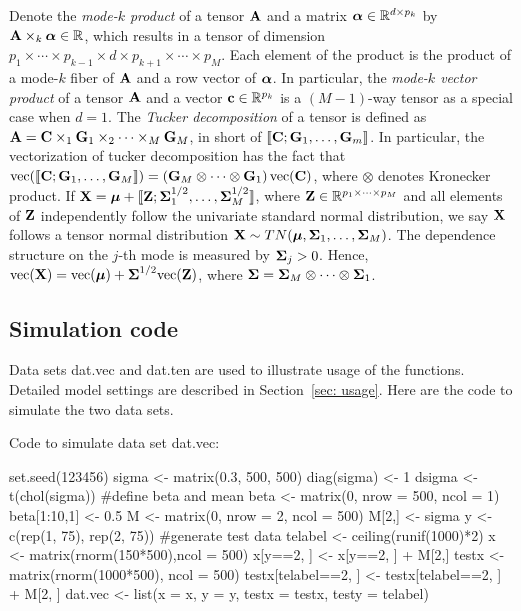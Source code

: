  
 Denote the \emph{mode-$k$ product} of a tensor $\mathbf{A}$ and a matrix $\boldsymbol{\alpha}\in\mathbb{R}^{d\times p_{k}}$ by $\mathbf{A}\times_{k}\boldsymbol{\alpha}\in\mathbb{R}$, which results in a tensor of dimension $p_{1}\times\cdots\times p_{k-1}\times d\times p_{k+1}\times\cdots\times p_M$. Each element of the product is the product of a mode-$k$ fiber of $\mathbf{A}$ and a row vector of $\boldsymbol{\alpha}$. In particular, the \emph{mode-$k$ vector product} of a tensor $\mathbf{A}$ and a vector $\mathbf{c}\in\mathbb{R}^{p_k}$ is a $(M-1)$-way tensor as a special case when $d=1$.
 The \emph{Tucker decomposition} of a tensor is defined as $\mathbf{A} = \mathbf{C}\times_{1}\mathbf{G}_1\times_{2}\cdots\times_{M}\mathbf{G}_M$, in short of $\llbracket\mathbf{C};\mathbf{G}_1,\dots,\mathbf{G}_m\rrbracket$. In particular, the vectorization of tucker decomposition has the fact that $\mathrm{vec}(\llbracket\mathbf{C};\mathbf{G}_1,\dots,\mathbf{G}_M\rrbracket)=\left(\mathbf{G}_M\otimes\cdots\otimes\mathbf{G}_1\right)\mathrm{vec}(\mathbf{C})$, where $\otimes$ denotes Kronecker product. 
 If $\mathbf{X}=\boldsymbol{\mu}+\llbracket \mathbf{Z}; \boldsymbol{\Sigma}_1^{1/2},\ldots,\boldsymbol{\Sigma}_M^{1/2}\rrbracket$, where $\mathbf{Z}\in\mathbb{R}^{p_1\times\cdots\times p_M}$ and all elements of $\mathbf{Z}$ independently follow the univariate standard normal distribution, we say $\mathbf{X}$ follows a tensor normal distribution $\mathbf{X}\sim TN(\boldsymbol{\mu}, \boldsymbol{\Sigma}_1,\ldots,\boldsymbol{\Sigma}_{M})$. The dependence structure on the $j$-th mode is measured by $\boldsymbol{\Sigma}_j>0$. Hence, $\mathrm{vec}(\mathbf{X})=\mathrm{vec}(\boldsymbol{\mu}) + \boldsymbol{\Sigma}^{1/2}\mathrm{vec}(\mathbf{Z})$, where $\boldsymbol{\Sigma}=\boldsymbol{\Sigma}_M\otimes\cdots\otimes\boldsymbol{\Sigma}_1$.
 
 
 
 \subsection{Simulation code}
 
 Data sets dat.vec and dat.ten are used to illustrate usage of the functions. Detailed model settings are described in Section~\ref{sec: usage}. Here are the code to simulate the two data sets.
 
 Code to simulate data set dat.vec:
 
\begin{example}
set.seed(123456)
sigma <- matrix(0.3, 500, 500)
diag(sigma) <- 1
dsigma <- t(chol(sigma))
#define beta and mean
beta <- matrix(0, nrow = 500, ncol = 1)
beta[1:10,1] <- 0.5
M <- matrix(0, nrow = 2, ncol = 500)
M[2,] <- sigma%
y <- c(rep(1, 75), rep(2, 75))
#generate test data
telabel <- ceiling(runif(1000)*2)
x <- matrix(rnorm(150*500),ncol = 500)%
x[y==2, ] <- x[y==2, ] + M[2,]
testx <- matrix(rnorm(1000*500), ncol = 500) %
testx[telabel==2, ] <- testx[telabel==2, ] + M[2, ]
dat.vec <- list(x = x, y = y, testx = testx, testy = telabel)
\end{example} 
 
